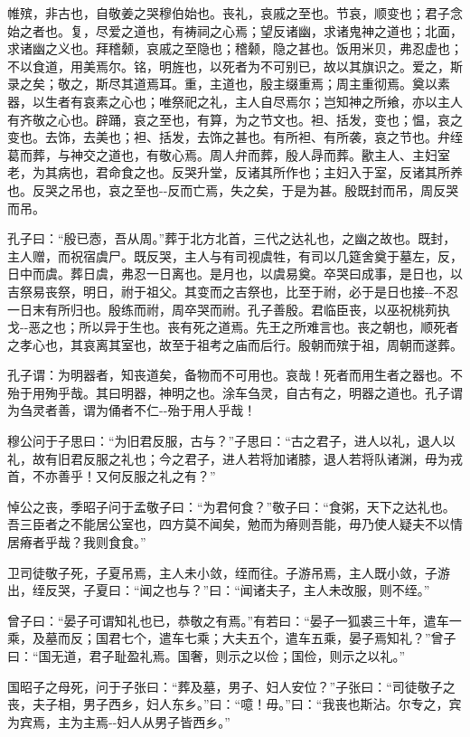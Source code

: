 \documentclass[]{article}
\begin{document}
帷殡，非古也，自敬姜之哭穆伯始也。丧礼，哀戚之至也。节哀，顺变也；君子念始之者也。复，尽爱之道也，有祷祠之心焉；望反诸幽，求诸鬼神之道也；北面，求诸幽之义也。拜稽颡，哀戚之至隐也；稽颡，隐之甚也。饭用米贝，弗忍虚也；不以食道，用美焉尔。铭，明旌也，以死者为不可别已，故以其旗识之。爱之，斯录之矣；敬之，斯尽其道焉耳。重，主道也，殷主缀重焉；周主重彻焉。奠以素器，以生者有哀素之心也；唯祭祀之礼，主人自尽焉尔；岂知神之所飨，亦以主人有齐敬之心也。辟踊，哀之至也，有算，为之节文也。袒、括发，变也；愠，哀之变也。去饰，去美也；袒、括发，去饰之甚也。有所袒、有所袭，哀之节也。弁绖葛而葬，与神交之道也，有敬心焉。周人弁而葬，殷人冔而葬。歠主人、主妇室老，为其病也，君命食之也。反哭升堂，反诸其所作也；主妇入于室，反诸其所养也。反哭之吊也，哀之至也-\/-反而亡焉，失之矣，于是为甚。殷既封而吊，周反哭而吊。

孔子曰：``殷已悫，吾从周。''葬于北方北首，三代之达礼也，之幽之故也。既封，主人赠，而祝宿虞尸。既反哭，主人与有司视虞牲，有司以几筵舍奠于墓左，反，日中而虞。葬日虞，弗忍一日离也。是月也，以虞易奠。卒哭曰成事，是日也，以吉祭易丧祭，明日，祔于祖父。其变而之吉祭也，比至于祔，必于是日也接-\/-不忍一日末有所归也。殷练而祔，周卒哭而祔。孔子善殷。君临臣丧，以巫祝桃茢执戈-\/-恶之也；所以异于生也。丧有死之道焉。先王之所难言也。丧之朝也，顺死者之孝心也，其哀离其室也，故至于祖考之庙而后行。殷朝而殡于祖，周朝而遂葬。

孔子谓：为明器者，知丧道矣，备物而不可用也。哀哉！死者而用生者之器也。不殆于用殉乎哉。其曰明器，神明之也。涂车刍灵，自古有之，明器之道也。孔子谓为刍灵者善，谓为俑者不仁-\/-殆于用人乎哉！

穆公问于子思曰：``为旧君反服，古与？''子思曰：``古之君子，进人以礼，退人以礼，故有旧君反服之礼也；今之君子，进人若将加诸膝，退人若将队诸渊，毋为戎首，不亦善乎！又何反服之礼之有？''

悼公之丧，季昭子问于孟敬子曰：``为君何食？''敬子曰：``食粥，天下之达礼也。吾三臣者之不能居公室也，四方莫不闻矣，勉而为瘠则吾能，毋乃使人疑夫不以情居瘠者乎哉？我则食食。''

卫司徒敬子死，子夏吊焉，主人未小敛，绖而往。子游吊焉，主人既小敛，子游出，绖反哭，子夏曰：``闻之也与？''曰：``闻诸夫子，主人未改服，则不绖。''

曾子曰：``晏子可谓知礼也已，恭敬之有焉。''有若曰：``晏子一狐裘三十年，遣车一乘，及墓而反；国君七个，遣车七乘；大夫五个，遣车五乘，晏子焉知礼？''曾子曰：``国无道，君子耻盈礼焉。国奢，则示之以俭；国俭，则示之以礼。''

国昭子之母死，问于子张曰：``葬及墓，男子、妇人安位？''子张曰：``司徒敬子之丧，夫子相，男子西乡，妇人东乡。''曰：``噫！毋。''曰：``我丧也斯沾。尔专之，宾为宾焉，主为主焉-\/-妇人从男子皆西乡。''
\end{document}
